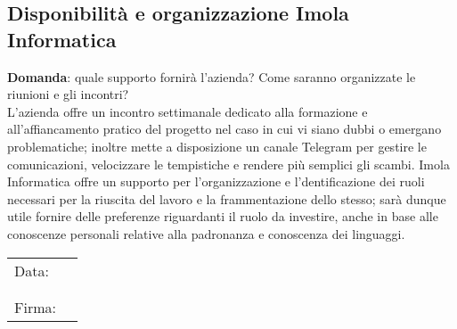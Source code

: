 \documentclass[italian,12pt]{article} %
\begin{document}
\begin{flushleft}
\subsection{Disponibilità e organizzazione Imola Informatica}
	\textbf{Domanda}: quale supporto fornirà l'azienda? Come saranno organizzate le riunioni e gli incontri?\\
	L’azienda offre un incontro settimanale dedicato alla formazione e all’affiancamento pratico del progetto nel caso in cui vi 
	siano dubbi o emergano problematiche; inoltre mette a disposizione un canale Telegram per gestire le comunicazioni, velocizzare le tempistiche e rendere più semplici gli scambi. Imola Informatica offre un supporto per 
	l’organizzazione e l’dentificazione dei ruoli necessari per la riuscita del lavoro e la frammentazione dello stesso; 
	sarà dunque utile fornire delle preferenze riguardanti il ruolo da investire, anche in base alle conoscenze personali 
	relative alla padronanza e conoscenza dei linguaggi.
	
\end{flushleft}


\vspace*{4cm}
\begin{table}[b]
\begin{tabular}{@{}p{.5in}p{4in}@{}}
	Data:  & \hrulefill \\
		   &     		\\
		   &     		\\
	Firma: & \hrulefill \\
\end{tabular}
\end{table}
	
\end{document}

